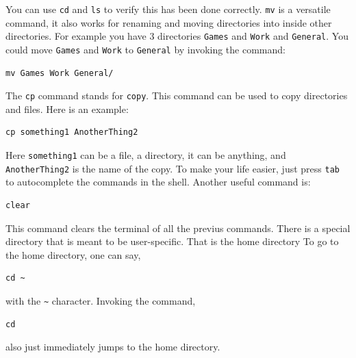 \documentclass[a4paper, 12pt]{report}
\begin{document}
\begin{center}
You can use \texttt{cd} and \texttt{ls} to verify this has been done correctly. \texttt{mv} is a versatile command, it also works for renaming and moving directories into inside other directories. For example you have $3$ directories \texttt{Games} and \texttt{Work} and \texttt{General}. You could move \texttt{Games} and \texttt{Work} to \texttt{General} by invoking the command:
\begin{lstlisting}
mv Games Work General/
\end{lstlisting}
The \texttt{cp} command stands for \texttt{copy}. This command can be used to copy directories and files. Here is an example:
\begin{lstlisting}
cp something1 AnotherThing2
\end{lstlisting}
Here \texttt{something1} can be a file, a directory, it can be anything, and \texttt{AnotherThing2} is the name of the copy. To make your life easier, just press \texttt{tab} to autocomplete the commands in the shell. Another useful command is:
\begin{lstlisting}
clear
\end{lstlisting}
This command clears the terminal of all the previus commands. There is a special directory that is meant to be user-specific. That is the home directory To go to the home directory, one can say,
\begin{lstlisting}
cd ~
\end{lstlisting}
with the \texttt{\~} character. Invoking the command,
\begin{lstlisting}
cd
\end{lstlisting}
also just immediately jumps to the home directory.


\end{center}
\end{document}
